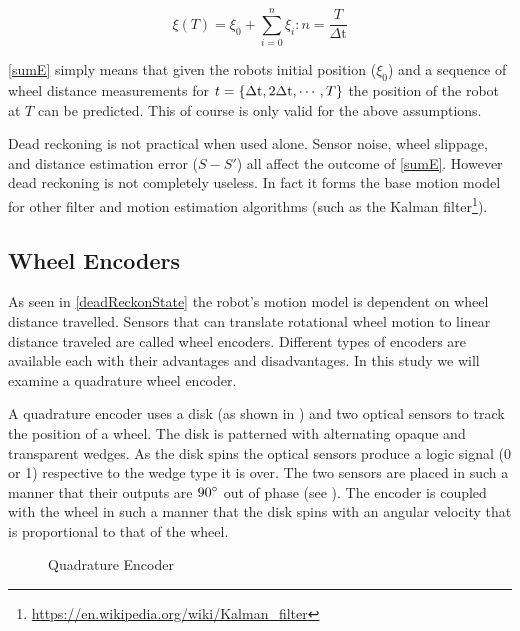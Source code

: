 \documentclass[main.tex]{subfiles}
\begin{document}
\begin{equation}
\label{eq:sumE}
\xi(T) = \xi_0 + \sum^{n}_{i=0} \xi_{i} : n = \frac{T}{\Delta\mathrm{t}}
\end{equation}

\eqref{sumE} simply means that given the robots initial position ($\xi_0$) and a sequence
of wheel distance measurements for $t=\{\Delta\mathrm{t},2\Delta\mathrm{t},\cdots,T\}$ the position of
the robot at $T$ can be predicted. This of course is only valid for the above
assumptions.

Dead reckoning is not practical when used alone. Sensor noise, wheel slippage,
and distance estimation error ($S-S\mathrm{'}$) all affect the outcome of
\eqref{sumE}. However dead reckoning is not completely useless. In fact it forms
the base motion model for other filter and motion estimation algorithms (such as
the Kalman filter\footnote{\url{https://en.wikipedia.org/wiki/Kalman_filter}}).

\subsection{Wheel Encoders}

As seen in \eqref{deadReckonState} the robot's motion model is dependent on
wheel distance travelled. Sensors that can translate rotational wheel motion to
linear distance traveled are called wheel encoders. Different types of encoders
are available each with their advantages and disadvantages. In this study we
will examine a quadrature wheel encoder. 

A quadrature encoder uses a disk (as shown in ) and two
optical sensors to track the position of a wheel. The disk is patterned with
alternating opaque and transparent wedges. As the disk spins the optical sensors
produce a logic signal (0 or 1) respective to the wedge type it is over. The two
sensors are placed in such a manner that their outputs are $90^\circ$ out of
phase (see ). The encoder is coupled with the wheel in such a
manner that the disk spins with an angular velocity that is proportional to that
of the wheel.

\begin{figure}[h]
	\begin{center}
	
	\end{center}
	\caption{Quadrature Encoder}
	\label{fig:quadEncode}
\end{figure}
\end{document}
